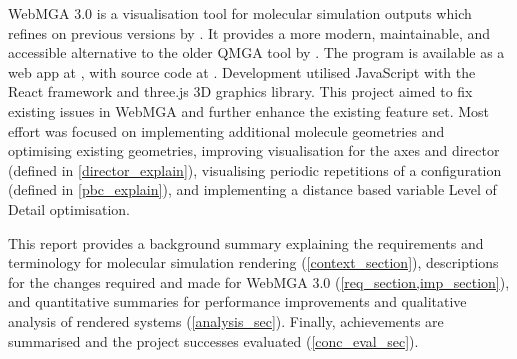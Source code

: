 WebMGA 3.0 is a visualisation tool for molecular simulation outputs which refines on previous versions by \textcite{Battistini_2021,webmga_2}. It provides a more modern, maintainable, and accessible alternative to the older QMGA tool by \textcite{gabriel2008molecular}. The program is available as a web app at , with source code at . Development utilised JavaScript with the React\cite{react} framework and three.js\cite{three} 3D graphics library. This project aimed to fix existing issues in WebMGA and further enhance the existing feature set. Most effort was focused on implementing additional molecule geometries and optimising existing geometries, improving visualisation for the axes and director (defined in \cref{director_explain}), visualising periodic repetitions of a configuration (defined in \cref{pbc_explain}), and implementing a distance based variable Level of Detail optimisation.

This report provides a background summary explaining the requirements and terminology for molecular simulation rendering (\cref{context_section}), descriptions for the changes required and made for WebMGA 3.0 (\cref{req_section,imp_section}), and quantitative summaries for performance improvements and qualitative analysis of rendered systems (\cref{analysis_sec}). Finally, achievements are summarised and the project successes evaluated (\cref{conc_eval_sec}).

